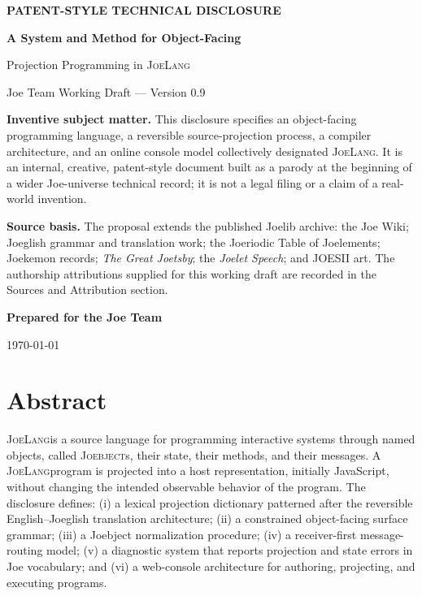 \documentclass[12pt]{article}
\newcommand{\JoeLang}{\textsc{JoeLang}}
\newcommand{\Joebject}{\textsc{Joebject}}
\begin{document}
\begin{titlepage}
\centering
{\Large\bfseries PATENT-STYLE TECHNICAL DISCLOSURE\par}
\vspace{1.2cm}
{\huge\bfseries A System and Method for Object-Facing\par
Projection Programming in \JoeLang\par}
\vspace{0.8cm}
{\Large Joe Team Working Draft --- Version 0.9\par}
\vfill
\begin{minipage}{0.88\textwidth}
\small
\textbf{Inventive subject matter.} This disclosure specifies an object-facing programming language, a reversible source-projection process, a compiler architecture, and an online console model collectively designated \JoeLang. It is an internal, creative, patent-style document built as a parody at the beginning of a wider Joe-universe technical record; it is not a legal filing or a claim of a real-world invention.

\vspace{0.6em}
\textbf{Source basis.} The proposal extends the published Joelib archive: the Joe Wiki; Joeglish grammar and translation work; the Joeriodic Table of Joelements; Joekemon records; \emph{The Great Joetsby}; the \emph{Joelet Speech}; and JOESII art. The authorship attributions supplied for this working draft are recorded in the Sources and Attribution section.
\end{minipage}
\vfill
\textbf{Prepared for the Joe Team}\par
\today
\end{titlepage}

\section*{Abstract}
\JoeLang is a source language for programming interactive systems through named objects, called \Joebject{}s, their state, their methods, and their messages. A \JoeLang program is projected into a host representation, initially JavaScript, without changing the intended observable behavior of the program. The disclosure defines: (i) a lexical projection dictionary patterned after the reversible English--Joeglish translation architecture; (ii) a constrained object-facing surface grammar; (iii) a Joebject normalization procedure; (iv) a receiver-first message-routing model; (v) a diagnostic system that reports projection and state errors in Joe vocabulary; and (vi) a web-console architecture for authoring, projecting, and executing programs.
\end{document}
